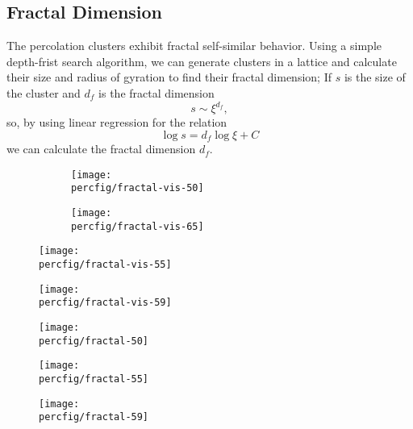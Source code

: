 \documentclass[12pt,a4paper]{article}
\newcommand{\percfig}{../fig/percolation}
\begin{document}
	\subsection{Fractal Dimension}
	The percolation clusters exhibit fractal self-similar behavior. Using a simple depth-frist search algorithm,
	we can generate clusters in a lattice and calculate their size and radius of gyration to find their
	fractal dimension; If $s$ is the size of the cluster and $d_f$ is the fractal dimension
	\begin{equation}
		s \sim \xi^{d_f},
	\end{equation}
	so, by using linear regression for the relation
	\begin{equation}
		\log{s} = d_f\log{\xi} + C
	\end{equation}
	we can calculate the fractal dimension $d_f$.
	\begin{figure}
		\centering
		\begin{subfigure}{0.45\linewidth}
			\centering
			\texttt{[image: \\percfig/fractal-vis-50]}
		\end{subfigure}
		\begin{subfigure}{0.45\linewidth}
			\centering
			\texttt{[image: \\percfig/fractal-vis-65]}
		\end{subfigure}
	\end{figure}
	\restoregeometry
	\begin{figure}[htb!]
		\centering
		\texttt{[image: \\percfig/fractal-vis-55]}
	\end{figure}
	\restoregeometry
	\thispagestyle{empty}
	\begin{figure}[htb!]
		\centering
		\texttt{[image: \\percfig/fractal-vis-59]}
	\end{figure}
	\begin{figure}[htb!]
		\centering
		\texttt{[image: \\percfig/fractal-50]}
	\end{figure}
	\begin{figure}[htb!]
		\centering
		\texttt{[image: \\percfig/fractal-55]}
	\end{figure}
	\thispagestyle{empty}
	\begin{figure}[htb!]
		\centering
		\texttt{[image: \\percfig/fractal-59]}
	\end{figure}
	\restoregeometry
\end{document}
